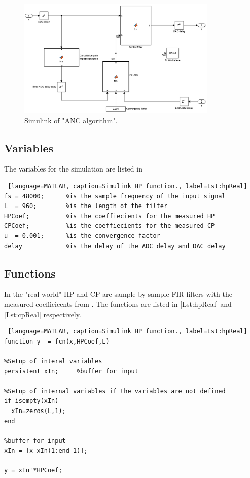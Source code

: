 \begin{figure}[H]
	\centering
	\includegraphics[width=0.85\textwidth]{figures/BasicSystem/SimulinkANC}
	\caption{Simulink of "ANC algorithm".}
	\label{fig:SimulinkANC}
\end{figure} 

\subsection{Variables}
The variables for the simulation are listed in 
\begin{lstlisting} [language=MATLAB, caption=Simulink HP function., label=Lst:hpReal]
fs = 48000; 	 %is the sample frequency of the input signal
L  = 960;  	 	 %is the length of the filter
HPCoef;  		 %is the coeffiecients for the measured HP
CPCoef;  		 %is the coeffiecients for the measured CP
u  = 0.001;		 %is the convergence factor
delay 			 %is the delay of the ADC delay and DAC delay
\end{lstlisting}

\subsection{Functions}
In the "real world" HP and CP are sample-by-sample FIR filters with the measured coefficicents from . The functions are listed in \autoref{Lst:hpReal} and  \autoref{Lst:cpReal} respectively. 

\begin{lstlisting} [language=MATLAB, caption=Simulink HP function., label=Lst:hpReal]
function y  = fcn(x,HPCoef,L)

%Setup of interal variables
persistent xIn;     %buffer for input

%Setup of internal variables if the variables are not defined
if isempty(xIn)
  xIn=zeros(L,1);
end

%buffer for input
xIn = [x xIn(1:end-1)];

y = xIn'*HPCoef;
\end{lstlisting}


